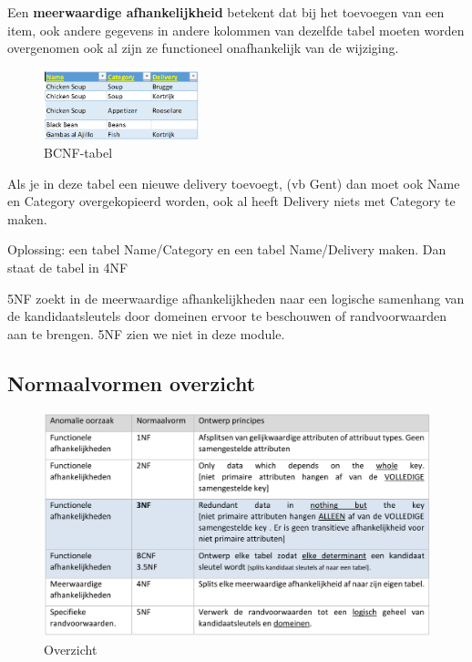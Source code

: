 \documentclass{article}
\newcommand{\bold}[1]{\textbf{#1}}
\begin{document}
Een \bold{meerwaardige
afhankelijkheid} betekent dat bij het toevoegen van een item, ook andere gegevens
in andere kolommen van dezelfde tabel moeten worden overgenomen ook al zijn ze 
functioneel onafhankelijk van de wijziging.

\begin{figure}[H]
    \centering
    \includegraphics[width=0.4\textwidth]{4NFvoorbeeld.png}
    \caption{BCNF-tabel}
\end{figure}

Als je in deze tabel een nieuwe delivery toevoegt, (vb Gent) dan moet ook Name
en Category overgekopieerd worden, ook al heeft Delivery niets met Category te maken.

Oplossing: een tabel Name/Category en een tabel Name/Delivery maken. Dan staat de tabel in 4NF

5NF zoekt in de meerwaardige afhankelijkheden naar een logische samenhang van 
de kandidaatsleutels door domeinen ervoor te beschouwen of randvoorwaarden aan te
brengen. 5NF zien we niet in deze module.

\subsection{Normaalvormen overzicht}

\begin{figure}[H]
    \centering
    \includegraphics[width=\textwidth]{Screenshot_20200325_175126.png}
    \caption{Overzicht}
\end{figure}
\end{document}
